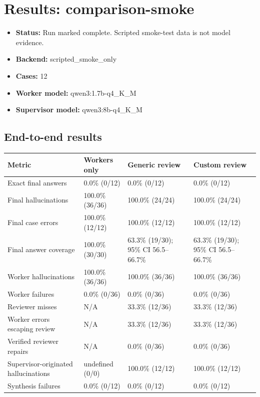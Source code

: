 \documentclass{article}
\begin{document}
\section*{Results: comparison-smoke}
\begin{itemize}
\item \textbf{Status:} Run marked complete. Scripted smoke-test data is not model evidence.
\item \textbf{Backend:} scripted\_smoke\_only
\item \textbf{Cases:} 12
\item \textbf{Worker model:} qwen3:1.7b-q4\_K\_M
\item \textbf{Supervisor model:} qwen3:8b-q4\_K\_M
\end{itemize}
\subsection*{End-to-end results}
\begin{center}
\small
\begin{tabularx}{\linewidth}{lXXX}
\toprule
Metric & Workers only & Generic review & Custom review \\
\midrule
Exact final answers & 0.0\% (0/12) & 0.0\% (0/12) & 0.0\% (0/12) \\
Final hallucinations & 100.0\% (36/36) & 100.0\% (24/24) & 100.0\% (24/24) \\
Final case errors & 100.0\% (12/12) & 100.0\% (12/12) & 100.0\% (12/12) \\
Final answer coverage & 100.0\% (30/30) & 63.3\% (19/30); 95\% CI 56.5--66.7\% & 63.3\% (19/30); 95\% CI 56.5--66.7\% \\
Worker hallucinations & 100.0\% (36/36) & 100.0\% (36/36) & 100.0\% (36/36) \\
Worker failures & 0.0\% (0/36) & 0.0\% (0/36) & 0.0\% (0/36) \\
Reviewer misses & N/A & 33.3\% (12/36) & 33.3\% (12/36) \\
Worker errors escaping review & N/A & 33.3\% (12/36) & 33.3\% (12/36) \\
Verified reviewer repairs & N/A & 0.0\% (0/36) & 0.0\% (0/36) \\
Supervisor-originated hallucinations & undefined (0/0) & 100.0\% (12/12) & 100.0\% (12/12) \\
Synthesis failures & 0.0\% (0/12) & 0.0\% (0/12) & 0.0\% (0/12) \\
\bottomrule
\end{tabularx}
\end{center}
\end{document}
